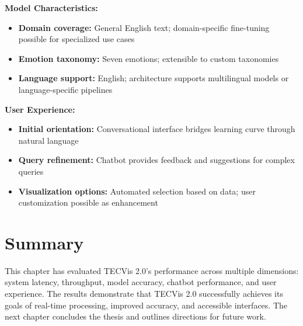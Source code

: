 \textbf{Model Characteristics:}
\begin{itemize}
\item \textbf{Domain coverage:} General English text; domain-specific fine-tuning possible for specialized use cases
\item \textbf{Emotion taxonomy:} Seven emotions; extensible to custom taxonomies
\item \textbf{Language support:} English; architecture supports multilingual models or language-specific pipelines
\end{itemize}

\textbf{User Experience:}
\begin{itemize}
\item \textbf{Initial orientation:} Conversational interface bridges learning curve through natural language
\item \textbf{Query refinement:} Chatbot provides feedback and suggestions for complex queries
\item \textbf{Visualization options:} Automated selection based on data; user customization possible as enhancement
\end{itemize}


\section{Summary}

This chapter has evaluated TECVis 2.0's performance across multiple dimensions: system latency, throughput, model accuracy, chatbot performance, and user experience. The results demonstrate that TECVis 2.0 successfully achieves its goals of real-time processing, improved accuracy, and accessible interfaces. The next chapter concludes the thesis and outlines directions for future work.


